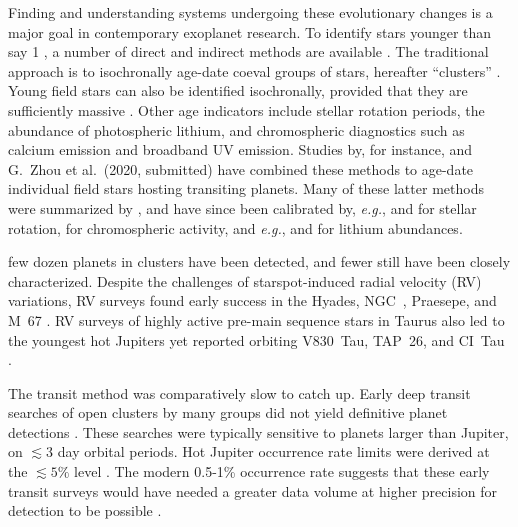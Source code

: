 \documentclass[12pt,twocolumn,tighten]{aastex63}
\begin{document}
Finding and understanding systems undergoing these evolutionary
changes is a major goal in contemporary exoplanet research.  To
identify stars younger than say 1 , a number
of direct and indirect methods are available
\citep{soderblom_ages_2010}.  The traditional approach is to
isochronally age-date coeval groups of stars, hereafter ``clusters''
\citep[{\it
e.g.},][]{lada_embedded_2003,zuckerman_young_2004,krumholz_star_2019}.
Young field stars can also be identified isochronally, provided that
they are sufficiently massive \citep{berger_gaia-kepler_2020}.  Other
age indicators include stellar rotation periods, the abundance of
photospheric lithium, and chromospheric diagnostics such as calcium
emission and broadband UV emission.  Studies by, for instance,
\citet{david_discovery_2018} and G{.}~Zhou et al{.}~(2020, submitted)
have combined these methods to age-date individual field stars hosting
transiting planets.  Many of these latter methods were summarized by
\citet{mamajek_improved_2008}, and have since been calibrated by, {\it
e.g.},
\citet{irwin_rotational_2009,barnes_color-period_2015,meibom_spin-down_2015,angus_calibrating_2015}
and \citet{curtis_tess_2019} for stellar rotation,
\citet{zerjal_chromospherically_2017} for chromospheric activity, and
{\it e.g.}, \citet{berger_identifying_2018} and
\citet{zerjal_galah_2019} for lithium abundances.


 few dozen planets in clusters have been
detected, and fewer still have been closely characterized.  Despite
the challenges of starspot-induced radial velocity (RV) variations, RV
surveys found early success in the Hyades, NGC~,
Praesepe, and M~67
\citep{Sato_et_al_2007,lovis_mayor_2007,Quinn_et_al_2012,Malavolta_et_al_2016,brucalassi_search_2017}.
RV surveys of highly active pre-main sequence stars in Taurus also led
to the youngest hot Jupiters yet reported orbiting V830~Tau, TAP~26,
and CI~Tau
\citep{donati_hj_2016,johns-krull_candidate_2016,yu_hot_2017,biddle_k2_2018,flagg_co_2019}.

The transit method was comparatively slow to catch up.  Early deep
transit searches of open clusters by many groups did not yield
definitive planet detections
\citep{mochejska_planets_2005,mochejska_planets_2006,burke_survey_2006,aigrain_monitor_2007,irwin_monitordata_2007,miller_monitor_2008,pepper_photometric_2008,hartman_MMT_IV_2009}.
These searches were typically sensitive to planets larger than
Jupiter, on $\lesssim 3$ day orbital periods.  Hot Jupiter occurrence
rate limits were derived at the $\lesssim 5\%$ level \citep[{\it
e.g.},][]{burke_survey_2006,hartman_MMT_IV_2009}.  The modern 0.5-1\%
occurrence rate suggests that these early transit surveys would have
needed a greater data volume at higher precision for detection to be
possible
\citep{mayor_harps_2011,wright_frequency_2012,howard_planet_2012,petigura_metallicity_2018}.
\end{document}
